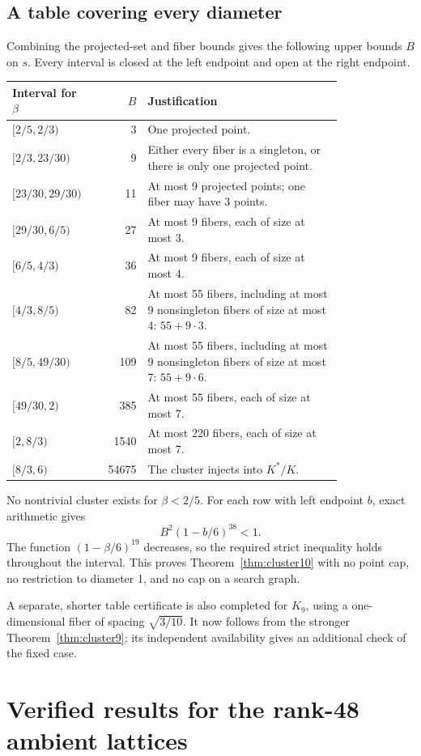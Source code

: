 \documentclass[11pt,a4paper]{article}
\theoremstyle{remark}\newtheorem{remark}[theorem]{Remark}
\begin{document}
\subsection{A table covering every diameter}

Combining the projected-set and fiber bounds gives the following upper bounds $B$ on $s$. Every interval is closed at the left endpoint and open at the right endpoint.
\begin{longtable}{P{0.22\linewidth}rP{0.59\linewidth}}
\toprule
Interval for $\beta$ &$B$&Justification\\\midrule
\endhead
$[2/5,2/3)$&3&One projected point.\\
$[2/3,23/30)$&9&Either every fiber is a singleton, or there is only one projected point.\\
$[23/30,29/30)$&11&At most 9 projected points; one fiber may have 3 points.\\
$[29/30,6/5)$&27&At most 9 fibers, each of size at most 3.\\
$[6/5,4/3)$&36&At most 9 fibers, each of size at most 4.\\
$[4/3,8/5)$&82&At most 55 fibers, including at most 9 nonsingleton fibers of size at most 4: $55+9\cdot3$.\\
$[8/5,49/30)$&109&At most 55 fibers, including at most 9 nonsingleton fibers of size at most 7: $55+9\cdot6$.\\
$[49/30,2)$&385&At most 55 fibers, each of size at most 7.\\
$[2,8/3)$&1540&At most 220 fibers, each of size at most 7.\\
$[8/3,6)$&54675&The cluster injects into $K^*/K$.\\
\bottomrule
\end{longtable}
No nontrivial cluster exists for $\beta<2/5$. For each row with left endpoint $b$, exact arithmetic gives
\[
B^2(1-b/6)^{38}<1.
\]
The function $(1-\beta/6)^{19}$ decreases, so the required strict inequality holds throughout the interval. This proves Theorem~\ref{thm:cluster10} with no point cap, no restriction to diameter 1, and no cap on a search graph.

A separate, shorter table certificate is also completed for $K_9$, using a one-dimensional fiber of spacing $\sqrt{3/10}$. It now follows from the stronger Theorem~\ref{thm:cluster9}; its independent availability gives an additional check of the fixed case.

\section{Verified results for the rank-48 ambient lattices}
\end{document}
